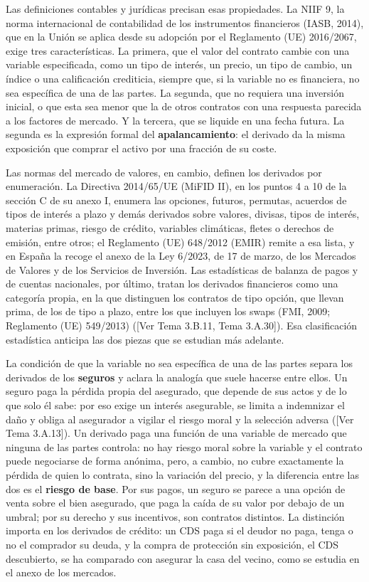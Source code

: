 \documentclass[10pt,a4paper]{article}
\newcommand{\authorfont}[1]{{\fontfamily{EBGaramond-TLF}\selectfont #1}}
\newcounter{anexo}
\begin{document}
Las definiciones contables y jurídicas precisan esas propiedades. La NIIF 9, la norma internacional de contabilidad de los instrumentos financieros (IASB, 2014), que en la Unión se aplica desde su adopción por el Reglamento (UE) 2016/2067, exige tres características. La primera, que el valor del contrato cambie con una variable especificada, como un tipo de interés, un precio, un tipo de cambio, un índice o una calificación crediticia, siempre que, si la variable no es financiera, no sea específica de una de las partes. La segunda, que no requiera una inversión inicial, o que esta sea menor que la de otros contratos con una respuesta parecida a los factores de mercado. Y la tercera, que se liquide en una fecha futura. La segunda es la expresión formal del \textbf{apalancamiento}: el derivado da la misma exposición que comprar el activo por una fracción de su coste.

Las normas del mercado de valores, en cambio, definen los derivados por enumeración. La Directiva 2014/65/UE (MiFID II), en los puntos 4 a 10 de la sección C de su anexo I, enumera las opciones, futuros, permutas, acuerdos de tipos de interés a plazo y demás derivados sobre valores, divisas, tipos de interés, materias primas, riesgo de crédito, variables climáticas, fletes o derechos de emisión, entre otros; el Reglamento (UE) 648/2012 (EMIR) remite a esa lista, y en España la recoge el anexo de la Ley 6/2023, de 17 de marzo, de los Mercados de Valores y de los Servicios de Inversión. Las estadísticas de balanza de pagos y de cuentas nacionales, por último, tratan los derivados financieros como una categoría propia, en la que distinguen los contratos de tipo opción, que llevan prima, de los de tipo a plazo, entre los que incluyen los swaps (FMI, 2009; Reglamento (UE) 549/2013) ([\authorfont{Ver Tema 3.B.11, Tema 3.A.30}]). Esa clasificación estadística anticipa las dos piezas que se estudian más adelante.

La condición de que la variable no sea específica de una de las partes separa los derivados de los \textbf{seguros} y aclara la analogía que suele hacerse entre ellos. Un seguro paga la pérdida propia del asegurado, que depende de sus actos y de lo que solo él sabe: por eso exige un interés asegurable, se limita a indemnizar el daño y obliga al asegurador a vigilar el riesgo moral y la selección adversa ([\authorfont{Ver Tema 3.A.13}]). Un derivado paga una función de una variable de mercado que ninguna de las partes controla: no hay riesgo moral sobre la variable y el contrato puede negociarse de forma anónima, pero, a cambio, no cubre exactamente la pérdida de quien lo contrata, sino la variación del precio, y la diferencia entre las dos es el \textbf{riesgo de base}. Por sus pagos, un seguro se parece a una opción de venta sobre el bien asegurado, que paga la caída de su valor por debajo de un umbral; por su derecho y sus incentivos, son contratos distintos. La distinción importa en los derivados de crédito: un CDS paga si el deudor no paga, tenga o no el comprador su deuda, y la compra de protección sin exposición, el CDS descubierto, se ha comparado con asegurar la casa del vecino, como se estudia en el anexo de los mercados.
\end{document}

